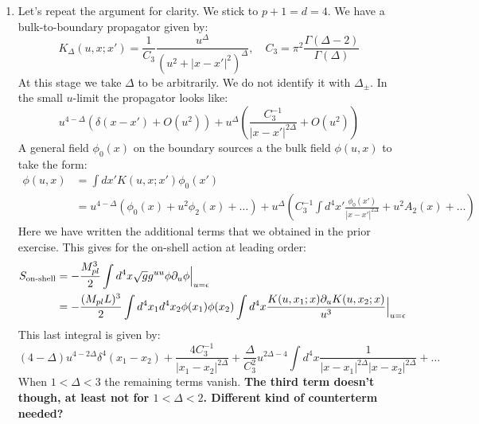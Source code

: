 \documentclass[11pt, class=article, crop=false]{standalone}
\begin{document}
\begin{enumerate}
	\item Let's repeat the argument for clarity. We stick to $p+1=d=4$. We have a bulk-to-boundary propagator given by:
	\[
		K_{\Delta}(u, x; x') = \frac{1}{C_3} \frac{u^\Delta}{(u^2 + |x-x'|^2)^\Delta}, \quad C_3 = \pi^2 \frac{\Gamma(\Delta-2)}{\Gamma(\Delta)}
	\]
	At this stage we take $\Delta$ to be arbitrarily. We do not identify it with $\Delta_\pm$. In the small $u$-limit the propagator looks like:
	\[
		u^{4-\Delta} (\delta(x- x') + O(u^2)) + u^{\Delta} \left(\frac{C_3^{-1}}{|x - x'|^{2\Delta}} + O(u^2)\right)
	\]
	A general field $\phi_0(x)$ on the boundary sources a the bulk field $\phi(u, x)$ to take the form:
	\begin{equation}\label{eq:small-u-phi}
	\begin{aligned}
		\phi(u, x) &= \int dx' K(u, x; x') \phi_0 (x') \\ 
		&= u^{4-\Delta} (\phi_0 (x) + u^2 \phi_2 (x) + \dots) +  u^{\Delta} \left(C_3^{-1} \int d^4x' \frac{\phi_0(x')}{|x-x'|^{2\Delta}} + u^2 A_2(x) + \dots \right)
	\end{aligned}
	\end{equation}
	Here we have written the additional terms that we obtained in the prior exercise. This gives for the on-shell action at leading order:
	\[
	\begin{aligned}
		S_{\text{on-shell}} &= - \frac{M_{pl}^3}{2} \int d^4 x \sqrt{g} g^{uu} \phi \partial_u \phi\Big|_{u = \epsilon}\\
		&= - \frac{(M_{pl} L)^3}{2} \int d^4 x_1 d^4 x_2 \phi(x_1) \phi(x_2) \int d^4 x \frac{K(u, x_1; x) \partial_u K(u, x_2; x)}{u^3}\Big|_{u = \epsilon}\\
	\end{aligned}
	\]
	This last integral is given by:
	\[
		(4-\Delta) u^{4-2\Delta} \delta^4 (x_1 - x_2) + \frac{4 C_3^{-1}}{|x_1 - x_2|^{2\Delta}} + \frac{\Delta}{C_3^2} u^{2 \Delta - 4} \int d^4 x \frac{1}{|x-x_1|^{2\Delta} |x-x_2|^{2\Delta}} + \dots
	\]
	When $1 < \Delta < 3$ the remaining terms vanish. \textbf{The third term doesn't though, at least not for $1<\Delta<2$. Different kind of counterterm needed?}
	

\end{enumerate}
\end{document}
